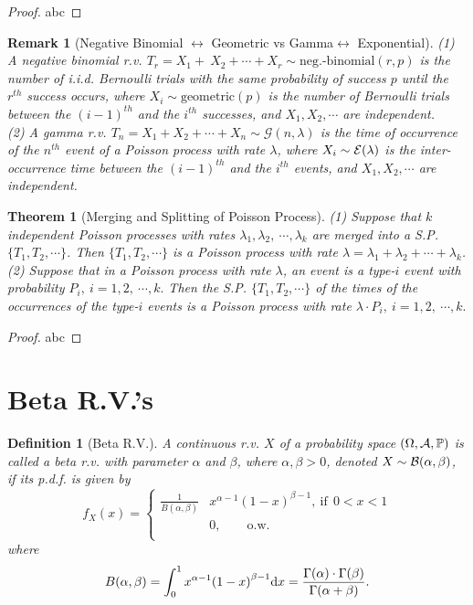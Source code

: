 \documentclass[openany,12pt]{book}
\newtheorem{theorem}{Theorem}[chapter]
\newtheorem{remark}{Remark}[chapter]
\newtheorem{definition}{Definition}[chapter]
\begin{document}
\begin{proof}
  abc
\end{proof}

\begin{remark}[Negative Binomial $\leftrightarrow$ Geometric vs Gamma$ \leftrightarrow$ Exponential]
(1) A negative binomial r.v. $T_r=X_1+\ X_2+\cdots+X_r\sim\text{neg.-binomial}(r,p)$ is the number of i.i.d. Bernoulli trials with the same probability of success $p$ until the $r^{th}$ success occurs, where $X_i\sim\mathrm{geometric}(p)$ is the number of Bernoulli trials between the ${(i-1)}^{th}$ and the $i^{th}$ successes, and $X_1,X_2,\cdots$ are independent.\\

(2) A gamma r.v. $T_n=X_1+X_2+\cdots+X_n\sim\mathcal{G}(n,\lambda)$ is the time of occurrence of the $n^{th}$ event of a Poisson process with rate $\lambda$, where $X_i\sim\mathcal{E}(\lambda)$ is the inter-occurrence time between the ${(i-1)}^{th}$ and the $i^{th}$ events, and $X_1,X_2,\cdots$ are independent.
\end{remark}

\begin{theorem}[Merging and Splitting of Poisson Process]
(1) Suppose that $k$ independent Poisson processes with rates $\lambda_1,\lambda_2,\ \cdots,\lambda_k$ are merged into a S.P. $\{T_1,T_2,\cdots\}$. Then $\{T_1,T_2,\cdots\}$ is a Poisson process with rate $\lambda=\lambda_1+\lambda_2+\cdots+\lambda_k$.\\

(2) Suppose that in a Poisson process with rate $\lambda$, an event is a type-$i$ event with probability $P_i,\ i=1,2,\ \cdots,k.$ Then the S.P. $\{T_1,T_2,\cdots\}$ of the times of the occurrences of the type-$i$ events is a
 Poisson process with rate $\lambda\cdot P_i,\ i=1,2,\ \cdots,k.$
\end{theorem}

\begin{proof}
  abc
\end{proof}

\section{Beta R.V.'s}

\begin{definition}[Beta R.V.]
A continuous r.v. $X$ of a probability space $(\Omega,\mathcal{A},\mathbb{P})$ is called a beta r.v. with parameter $\alpha$ and $\beta$, where $\alpha,\beta>0$, denoted $X\sim\mathcal{B}(\alpha,\beta)$, if its p.d.f. is given by
\[f_{X}(x) = \left\{ \begin{aligned}
\frac{1}{B(\alpha,\beta)}&x^{\alpha - 1}{(1 - x)}^{\beta - 1},\ \mathrm{\text{if}}\ \ 0 < x < 1 \\
&0, \qquad\mathrm{\text{o.w.}} \\
\end{aligned} \right.\]
where
\[B(\alpha,\beta) = \int_{0}^{1}x^{\alpha - 1}{(1 - x)}^{\beta - 1}\mathrm{d} x = \frac{\Gamma( \alpha ) \cdot \Gamma( \beta )}{\Gamma( \alpha + \beta )}.\]
\end{definition}
\end{document}
